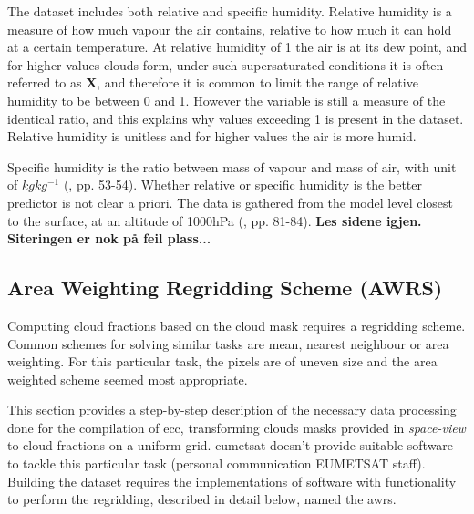 The dataset includes both relative and specific humidity. Relative humidity is a measure of how much vapour the air contains, relative to how much it can hold at a certain temperature. At relative humidity of 1 the air is at its dew point, and for higher values clouds form, under such supersaturated conditions it is often referred to as \textbf{X}, and therefore it is common to limit the range of relative humidity to be between 0 and 1. However the variable is still a measure of the identical ratio, and this explains why values exceeding 1 is present in the dataset. Relative humidity is unitless and for higher values the air is more humid.

Specific humidity is the ratio between mass of vapour and mass of air, with unit of $kg kg^{-1}$ (\cite{lohmann2016}, pp. 53-54). Whether relative or specific humidity is the better predictor is not clear a priori. The data is gathered from the model level closest to the surface, at an altitude of 1000hPa (\cite{lohmann2016}, pp. 81-84). \textbf{Les sidene igjen. Siteringen er nok på feil plass...}
\subsection{Area Weighting Regridding Scheme (AWRS)} \label{sec:remapping}
Computing cloud fractions based on the cloud mask requires a regridding scheme. Common schemes for solving similar tasks are mean, nearest neighbour or area weighting. For this particular task, the pixels are of uneven size and the area weighted scheme seemed most appropriate. 

This section provides a step-by-step description of the necessary data processing done for the compilation of \acrshort{ecc}, transforming clouds masks provided in \textit{space-view} to cloud fractions on a uniform grid. \acrshort{eumetsat} doesn't provide suitable software to tackle this particular task (personal communication EUMETSAT staff). Building the dataset requires the implementations of software with functionality to perform the regridding, described in detail below, named the \acrfull{awrs}.

